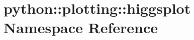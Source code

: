 \hypertarget{namespacepython_1_1plotting_1_1higgsplot}{
\section{python::plotting::higgsplot Namespace Reference}
\label{namespacepython_1_1plotting_1_1higgsplot}
}
